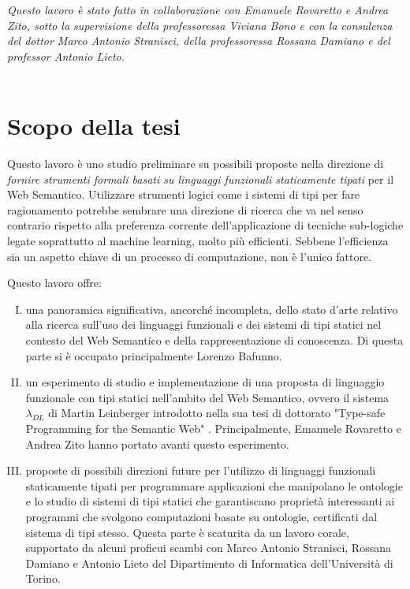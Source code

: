 \textsl{Questo lavoro è stato fatto in collaborazione con Emanuele Rovaretto e Andrea Zito, sotto la supervisione della professoressa Viviana Bono e con la consulenza del dottor Marco Antonio Stranisci, della professoressa Rossana Damiano e del professor Antonio Lieto.}\\\\


\section{Scopo della tesi}
Questo lavoro è uno studio preliminare su possibili proposte nella direzione di \textsl{fornire strumenti formali basati su linguaggi funzionali staticamente tipati} per il Web Semantico. Utilizzare strumenti logici come i sistemi di tipi per fare ragionamento potrebbe sembrare una direzione di ricerca che va nel senso contrario rispetto alla preferenza corrente dell'applicazione di tecniche sub-logiche legate soprattutto al machine learning, molto più efficienti. Sebbene l'efficienza sia un aspetto chiave di un processo di computazione, non è l'unico fattore.

Questo lavoro offre:
\begin{enumerate}[I)]
	\item una panoramica significativa, ancorché incompleta, dello stato d'arte relativo alla ricerca sull'uso dei linguaggi funzionali e dei sistemi di tipi statici nel contesto del Web Semantico e della rappresentazione di conoscenza. Di questa parte si è occupato principalmente Lorenzo Bafunno.
	\label{itm:I}
	\item  un esperimento di studio e implementazione di una proposta di linguaggio funzionale con tipi statici nell'ambito del Web Semantico, ovvero il sistema $\lambda_{DL}$ di Martin Leinberger introdotto nella sua tesi di dottorato "Type-safe Programming for the Semantic Web" \cite{leinbergerphdthesis}. Principalmente, Emanuele Rovaretto e Andrea Zito hanno portato avanti questo esperimento.
	\item proposte di possibili direzioni future per l’utilizzo di linguaggi funzionali staticamente tipati per programmare applicazioni che manipolano le ontologie e lo studio di sistemi di tipi statici che garantiscano proprietà interessanti ai programmi che svolgono computazioni basate su ontologie, certificati dal sistema di tipi stesso. Questa parte è scaturita da un lavoro corale, supportato da 
alcuni proficui scambi con Marco Antonio Stranisci, Rossana Damiano e Antonio Lieto del Dipartimento di Informatica dell’Università di Torino.	
	
\end{enumerate}
\newpage
\noindent

